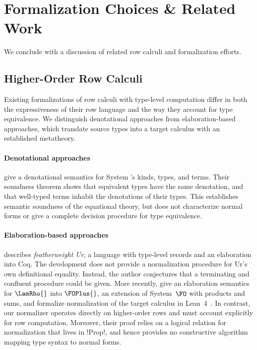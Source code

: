 
\section{Formalization Choices \& Related Work}
\label{sec:related-work}

We conclude with a discussion of related row calculi and formalization efforts.

\subsection{Higher-Order Row Calculi}

Existing formalizations of row calculi with type-level computation differ in both the expressiveness of their row language and the way they account for type equivalence. We distinguish denotational approaches from elaboration-based approaches, which translate source types into a target calculus with an established metatheory.

\paragraph{Denotational approaches}

 give a denotational semantics for System \RO's kinds, types, and terms. Their soundness theorem shows that equivalent types have the same denotation, and that well-typed terms inhabit the denotations of their types. This establishes semantic soundness of the equational theory, but does not characterize normal forms or give a complete decision procedure for type equivalence.

\paragraph{Elaboration-based approaches}

 describes \emph{featherweight Ur}, a language with type-level records and an elaboration into Coq. The development does not provide a normalization procedure for Ur's own definitional equality. Instead, the author conjectures that a terminating and confluent procedure could be given. More recently,  give an elaboration semantics for $\LamRho{}$ into $\FOPlus{}$, an extension of System~$\FO$ with products and sums, and formalize normalization of the target calculus in Lean~4~\citep{Lean4}. In contrast, our normalizer operates directly on higher-order rows and must account explicitly for row computation. Moreover, their proof relies on a logical relation for normalization that lives in !Prop!, and hence provides no constructive algorithm mapping type syntax to normal forms.

